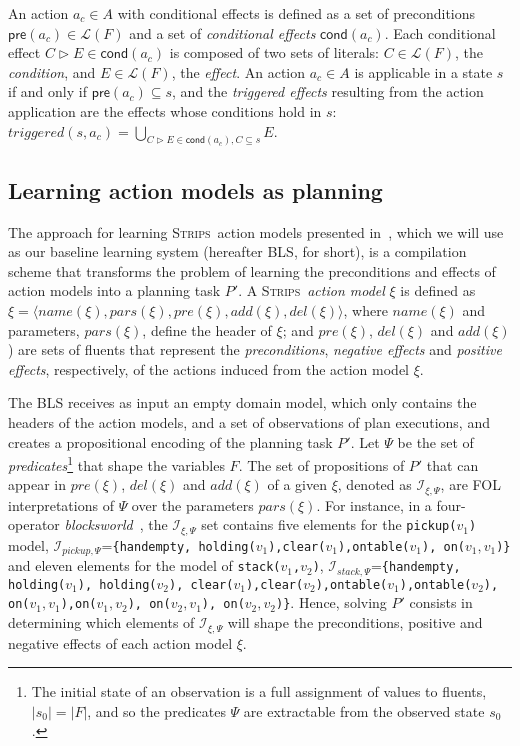 \documentclass[letterpaper]{article} %
\newcommand{\tup}[1]{{\langle #1 \rangle}}
\newcommand{\pre}{\mathsf{pre}}     %
\newcommand{\cond}{\mathsf{cond}}   %
\newcommand{\strips}{\textsc{Strips}}     %
\begin{document}
An action $a_c\in A$ with conditional effects is defined as a set of preconditions $\pre(a_c)\in\mathcal{L}(F)$ and a set of {\em conditional effects} $\cond(a_c)$. Each conditional effect $C\rhd E\in\cond(a_c)$ is composed of two sets of literals: $C\in\mathcal{L}(F)$, the {\em condition}, and $E\in\mathcal{L}(F)$, the {\em effect}. An action $a_c\in A$ is applicable in a state $s$ if and only if $\pre(a_c)\subseteq s$, and the {\em triggered effects} resulting from the action application are the effects whose conditions hold in $s$: $triggered(s,a_c)=\bigcup_{C\rhd E\in\cond(a_c),C\subseteq s} E$.


\subsection{Learning action models as planning}
\label{FAMA}

The approach for learning \strips\ action models presented in~\cite{aineto2018learning}, which we will use as our baseline learning system (hereafter BLS, for short), is a compilation scheme that transforms the problem of learning the preconditions and effects of action models into a planning task $P'$. A \strips\ \emph{action model} $\xi$ is defined as $\xi=\tup{name(\xi),pars(\xi),pre(\xi),add(\xi),del(\xi)}$, where $name(\xi)$ and parameters, $pars(\xi)$, define the header of $\xi$; and $pre(\xi)$, $del(\xi)$ and $add(\xi)$) are sets of fluents that represent the {\em preconditions}, {\em negative effects} and {\em positive effects}, respectively, of the actions induced from the action model $\xi$.

The BLS receives as input an empty domain model, which only contains the headers of the action models, and a set of observations of plan executions, and creates a propositional encoding of the planning task $P'$. Let $\Psi$ be the set of {\em predicates}\footnote{The initial state of an observation is a full assignment of values to fluents, $|s_0|=|F|$, and so the predicates $\Psi$ are extractable from the observed state $s_0$.} that shape the variables $F$. The set of propositions of $P'$ that can appear in $pre(\xi)$, $del(\xi)$ and $add(\xi)$ of a given $\xi$, denoted as ${\mathcal I}_{\xi,\Psi}$, are FOL interpretations of $\Psi$ over the parameters $pars(\xi)$. For instance, in a four-operator {\em blocksworld}~\cite{slaney2001blocks}, the ${\mathcal I}_{\xi,\Psi}$ set contains five elements for the {\small \tt pickup($v_1$)} model, ${\mathcal I}_{pickup,\Psi}$={\small\tt\{handempty, holding($v_1$),clear($v_1$),ontable($v_1$), on($v_1,v_1$)\}} and eleven elements for the model of {\small \tt stack($v_1$,$v_2$)}, ${\mathcal I}_{stack,\Psi}$={\small\tt\{handempty, holding($v_1$), holding($v_2$), clear($v_1$),clear($v_2$),ontable($v_1$),ontable($v_2$), \\
on($v_1,v_1$),on($v_1,v_2$), on($v_2,v_1$), on($v_2,v_2$)\}}. Hence, solving $P'$ consists in determining which elements of ${\mathcal I}_{\xi,\Psi}$ will shape the preconditions, positive and negative effects of each action model $\xi$.
\end{document}
